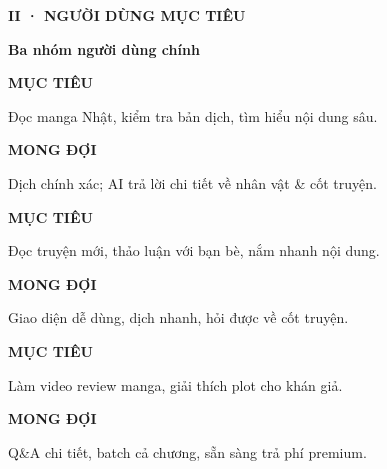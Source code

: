 \documentclass[aspectratio=169,10pt]{beamer}
\newcommand{\kick}[1]{{\headfont\bfseries\footnotesize\textcolor{mred}{\MakeUppercase{#1}}}}
\newcommand{\slidehead}[2]{%
  \kick{#1}\par\vspace{0.6mm}%
  {\headfont\bfseries\LARGE\textcolor{ink}{#2}}\par\vspace{1.2mm}}
\begin{document}
\begin{frame}
\slidehead{II · Người dùng mục tiêu}{Ba nhóm người dùng chính}
\vspace{1mm}
\begin{tcbraster}[raster columns=3, raster equal height=rows, raster column skip=3mm]
\begin{tcolorbox}[card,colbacktitle=mred,coltitle=white,title={Sinh viên đại học \hfill 18–25}]\small
{\kick{Mục tiêu}}\par Đọc manga Nhật, kiểm tra bản dịch, tìm hiểu nội dung sâu.\par\vspace{2mm}
{\kick{Mong đợi}}\par\textcolor{slate}{Dịch chính xác; AI trả lời chi tiết về nhân vật \& cốt truyện.}
\end{tcolorbox}
\begin{tcolorbox}[card,colbacktitle=mblue,coltitle=white,title={Học sinh THPT \hfill 15–18}]\small
{\kick{Mục tiêu}}\par Đọc truyện mới, thảo luận với bạn bè, nắm nhanh nội dung.\par\vspace{2mm}
{\kick{Mong đợi}}\par\textcolor{slate}{Giao diện dễ dùng, dịch nhanh, hỏi được về cốt truyện.}
\end{tcolorbox}
\begin{tcolorbox}[card,colbacktitle=gold,coltitle=white,title={Content creator \hfill 25–35}]\small
{\kick{Mục tiêu}}\par Làm video review manga, giải thích plot cho khán giả.\par\vspace{2mm}
{\kick{Mong đợi}}\par\textcolor{slate}{Q\&A chi tiết, batch cả chương, sẵn sàng trả phí premium.}
\end{tcolorbox}
\end{tcbraster}
\end{frame}
\end{document}
